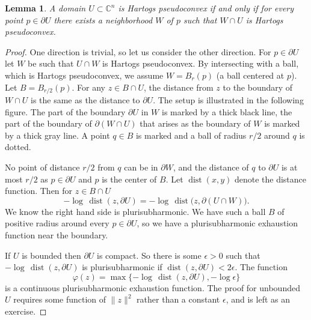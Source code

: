 \documentclass[12pt,openany]{book}
\newcommand{\snorm}[1]{\lVert {#1} \rVert}
\newcommand{\C}{{\mathbb{C}}}
\theoremstyle{plain}
\newtheorem{lemma}[thm]{Lemma}
\theoremstyle{remark}
\theoremstyle{definition}
\theoremstyle{exercise}
\theoremstyle{example}
\begin{document}
\begin{lemma}
A domain $U \subset \C^n$ is Hartogs pseudoconvex if and only if
for every point $p \in \partial U$ there exists a neighborhood $W$ of $p$
such that $W \cap U$ is Hartogs pseudoconvex.
\end{lemma}

\begin{proof}
One direction is trivial,
so let us consider the other direction.  For $p \in \partial U$ let
$W$ be such that $U \cap W$
is Hartogs pseudoconvex.  By intersecting with a ball, which is
Hartogs pseudoconvex, we assume $W = B_r(p)$ (a ball centered at $p$).
Let $B = B_{r/2}(p)$.  For
any $z \in B \cap U$, the distance from $z$ to the boundary of $W \cap U$ is the same as
the distance to $\partial U$.  The setup is illustrated in the following
figure.  The part of the boundary $\partial U$ in $W$ is marked by a thick
black line, the part of the boundary of $\partial (W \cap U)$ that arises as
the boundary of $W$ is marked by a thick gray line.  A point $q \in B$ is
marked and a ball of radius $r/2$ around $q$ is dotted.

\begin{center}

\end{center}

No point of distance $r/2$ from $q$ can be in $\partial W$, and 
the distance of $q$ to $\partial U$ is at most $r/2$ as $p \in \partial U$
and $p$ is the center of $B$.
Let $\operatorname{dist}(x,y)$ denote the
distance function.  Then for $z \in B \cap U$
\begin{equation*}
- \log \, \operatorname{dist}(z, \partial U) = 
- \log \, \operatorname{dist}\bigl(z, \partial (U \cap W)\bigr).
\end{equation*}
We know the right hand side is plurisubharmonic.  We have such a ball $B$ of
positive radius around every $p \in \partial U$, so we have a
plurisubharmonic
exhaustion function near the boundary.

If $U$ is bounded then $\partial U$ is compact.  So there is some
$\epsilon > 0$ such that $- \log \, \operatorname{dist}(z, \partial U)$
is plurisubharmonic if $\operatorname{dist}(z, \partial U) < 2\epsilon$.
The function
\begin{equation*}
\varphi(z) = \max \{
- \log \, \operatorname{dist}(z, \partial U) , - \log \epsilon \} 
\end{equation*}
is a continuous plurisubharmonic exhaustion function.  The proof for
unbounded $U$ requires some function of $\snorm{z}^2$ rather than a constant
$\epsilon$,
and is left as an exercise.
\end{proof}
\end{document}

